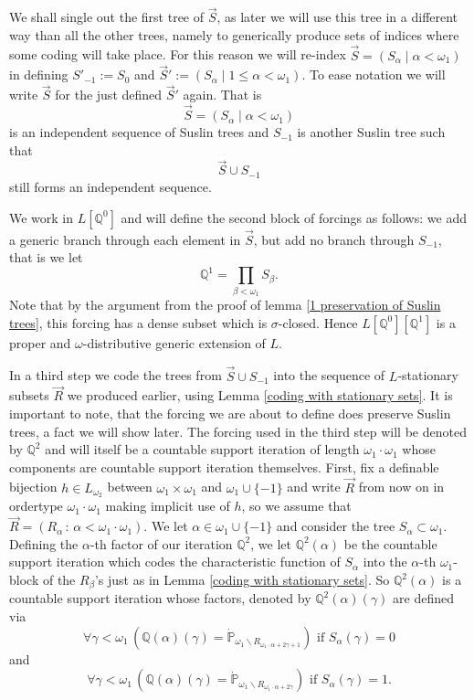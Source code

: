 \documentclass[a4paper,11pt]{article}
\newcommand{\forceP}{\mathbb{P}}
\newcommand{\forceQ}{\mathbb{Q}}
\begin{document}
We shall single out the first tree of $\vec{S}$, as later we will use this tree in a different way than all the other trees, namely to generically produce sets of indices where some coding will take place. For this reason we will re-index $\vec{S}= (S_{\alpha} \mid \alpha < \omega_1)$ in defining $S'_{-1}:= S_0$ and $\vec{S}':= (S_{\alpha} \mid 1 \le \alpha < \omega_1)$. To ease notation we will write $\vec{S}$ for the just defined $\vec{S}'$ again. That is \[\vec{S}= (S_{\alpha} \mid \alpha < \omega_1)\] is an independent sequence of Suslin trees and $S_{-1}$ is another Suslin tree such that
\[\vec{S} \cup S_{-1}\] still forms an independent sequence.


We work in $L[\forceQ^0]$ and will define the second block of forcings as follows: we add a generic branch through each element in $\vec{S}$, but add no branch through $S_{-1}$, that is we let
\[\forceQ^1= \prod_{\beta < \omega_1} S_{\beta}. \]
Note that by the argument from the proof of lemma \ref{1 preservation of Suslin trees}, this forcing has a dense subset which is $\sigma$-closed. Hence $L[\forceQ^0][\forceQ^1]$ is a proper and $\omega$-distributive generic extension of $L$.

In a third step we code the trees from $\vec{S} \cup S_{-1}$ into the sequence of $L$-stationary subsets $\vec{R}$ we produced earlier, using Lemma \ref{coding with stationary sets}. It is important to note, that the forcing we are about to define does preserve Suslin trees, a fact we will show later.
The forcing used in the third step will be denoted by $\mathbb{Q}^2$ and will itself be a countable support iteration of length $\omega_1 \cdot \omega_1$ whose components are countable support iteration themselves. First, fix a definable bijection $h \in L_{\omega_2}$ between $\omega_1 \times \omega_1$ and $\omega_1 \cup \{-1\}$ and write $\vec{R}$ from now on in ordertype $\omega_1 \cdot \omega_1$ making implicit use of $h$, so we assume that $\vec{R}= (R_{\alpha} \, : \, \alpha < \omega_1 \cdot \omega_1)$. We let $\alpha \in \omega_1 \cup \{ -1 \}$ and consider the tree $S_{\alpha} \subset \omega_1$. Defining the $\alpha$-th factor of our iteration $\forceQ^2$, we let $\forceQ^2 (\alpha)$ be the countable support iteration which codes the characteristic function of $S_{\alpha}$ into the $\alpha$-th $\omega_1$-block of the $R_{\beta}$'s just as in Lemma \ref{coding with stationary sets}. So $\forceQ^2 (\alpha)$ is a countable support iteration whose factors, denoted by $\forceQ^2(\alpha) (\gamma)$ are defined via
\[ \forall \gamma < \omega_1 \,(\forceQ (\alpha) (\gamma)= \dot{\forceP}_{\omega_1 \backslash R_{\omega_1 \cdot \alpha + 2 \gamma +1}}) \text{ if } S_{\alpha} (\gamma) =0 \]
and
\[ \forall \gamma < \omega_1 \, (\forceQ( \alpha) (\gamma)= \dot{\forceP}_{\omega_1 \backslash R_{\omega_1 \cdot \alpha + 2 \gamma}}) \text{ if } S_{\alpha} (\gamma) =1. \]
\end{document}
